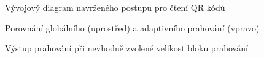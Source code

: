 \begin{figure}[H]
  \begin{center}
    \caption{Vývojový diagram navrženého postupu pro čtení QR kódů}
    \label{QRCodeReadingProcess}
  \end{center}
\end{figure}

\begin{figure}[H]
  \begin{center}
    \caption{Porovnání globálního (uprostřed) a adaptivního prahování (vpravo)}
    \label{GlobalAdaptiveThresholdingComparision}
  \end{center}
\end{figure}

\begin{figure}[H]
  \begin{center}
    \caption{Výstup prahování při nevhodně zvolené velikost bloku prahování}
    \label{LocalThresholdingBadSizeOfThresholdBlock}
  \end{center}
\end{figure}

